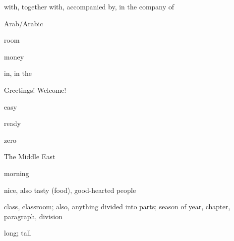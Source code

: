 \documentclass[avery5371,grid,frame]{flashcards}
\begin{document}
\begin{flashcard}{\LARGE with, together with, accompanied by, in the company of}
\LARGE {}
\end{flashcard}
\begin{flashcard}{\LARGE Arab/Arabic}
\LARGE {}
\end{flashcard}
\begin{flashcard}{\LARGE room}
\LARGE {}
\end{flashcard}
\begin{flashcard}{\LARGE money}
\LARGE {}
\end{flashcard}
\begin{flashcard}{\LARGE in, in the}
\LARGE {}
\end{flashcard}
\begin{flashcard}{\LARGE Greetings! Welcome!}
\LARGE {}
\end{flashcard}
\begin{flashcard}{\LARGE easy}
\LARGE {}
\end{flashcard}
\begin{flashcard}{\LARGE ready}
\LARGE {}
\end{flashcard}
\begin{flashcard}{\LARGE zero}
\LARGE {}
\end{flashcard}
\begin{flashcard}{\LARGE The Middle East}
\LARGE {}
\end{flashcard}
\begin{flashcard}{\LARGE morning}
\LARGE {}
\end{flashcard}
\begin{flashcard}{\LARGE nice, also tasty (food), good-hearted people}
\LARGE {}
\end{flashcard}
\begin{flashcard}{\LARGE class, classroom; also, anything divided into parts; season of year, chapter, paragraph, division}
\LARGE {}
\end{flashcard}
\begin{flashcard}{\LARGE long; tall}
\LARGE {}
\end{flashcard}
\end{document}

